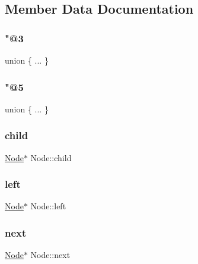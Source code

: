 \subsection{Member Data Documentation}
\mbox{\label{structNode_a54ef89ca60997c37464b33e2bc1fa520}} 
\subsubsection{\texorpdfstring{"@3}{@3}}
{\footnotesize\ttfamily union \{ ... \} }

\mbox{\label{structNode_a6be5b0f6c9a9396734c0e7cd97b35a85}} 
\subsubsection{\texorpdfstring{"@5}{@5}}
{\footnotesize\ttfamily union \{ ... \} }

\mbox{\label{structNode_ad55e191b2855879d7b761258d64e2667}} 
\subsubsection{\texorpdfstring{child}{child}}
{\footnotesize\ttfamily \hyperlink{structNode}{Node}$\ast$ Node\+::child}

\mbox{\label{structNode_ab8c667ac8fdb120ed4c031682a9cdaee}} 
\subsubsection{\texorpdfstring{left}{left}}
{\footnotesize\ttfamily \hyperlink{structNode}{Node}$\ast$ Node\+::left}

\mbox{\label{structNode_a2559a716f69ccaa76d648d9f1b83065e}} 
\subsubsection{\texorpdfstring{next}{next}}
{\footnotesize\ttfamily \hyperlink{structNode}{Node}$\ast$ Node\+::next}

\mbox{\label{structNode_a632ea91c6a13082308f7692649a68880}} 
